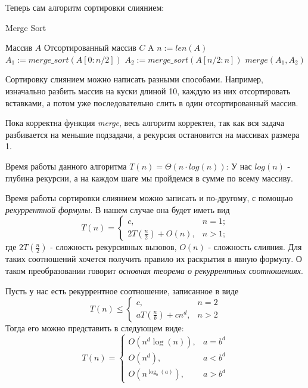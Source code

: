 \documentclass[../main.tex]{subfiles}
\begin{document}
	Теперь сам алгоритм сортировки слиянием:
	\begin{algorithm}[H]
		\caption{Merge Sort}
		\begin{algorithmic}[1]
			\Require Массив $A$
			\Ensure Отсортированный массив $C$
					\State \Return A
				\Else
					\State $n := len(A)$
					\State $A_1 := merge\_sort(A[0: n/2])$
					\State $A_2 := merge\_sort(A[n/2: n])$
					\State \Return $merge(A_1, A_2)$
				\EndIf
		
			\EndFunction
		\end{algorithmic}
	\end{algorithm}
	\begin{remark}
		Сортировку слиянием можно написать разными способами. Например, изначально разбить массив на куски длиной 10, каждую из них отсортировать вставками, а потом уже последовательно слить в один отсортированный массив.
	\end{remark}
	\begin{proof_cor}
		Пока корректна функция \textit{merge}, весь алгоритм корректен, так как вся задача разбивается на меньшие подзадачи, а рекурсия остановится на массивах размера 1.
	\end{proof_cor}
	\begin{time}
		Время работы данного алгоритма $T(n) = \Theta(n\cdot log(n))$: У нас $log(n)$ - глубина рекурсии, а на каждом шаге мы пройдемся в сумме по всему массиву. 
		
	\end{time} 
	
	
	Время работы сортировки слиянием можно записать и по-другому, с помощью \textit{рекуррентной формулы}. В нашем случае она будет иметь вид
	\[
	T(n) = 
	\begin{cases}
		c, & n = 1; \\
		2T(\frac{n}{2}) + O(n), & n > 1;
	\end{cases}
	\]
	где $2T(\frac{n}{2})$ - сложность рекурсивных вызовов, $O(n)$ - сложность слияния. Для таких соотношений хочется получить правило их раскрытия в явную формулу. О таком преобразовании говорит \textit{основная теорема о рекуррентных соотношениях}.
	
	\begin{theorem}
		Пусть у нас есть рекуррентное соотношение, записанное в виде
		\[
		T(n) \leqslant
		\begin{cases}
		c, & n = 2\\
		aT(\frac{n}{b}) + cn^d, & n > 2
		\end{cases}
		\]
		Тогда его можно представить в следующем виде:
		\[
		T(n) = 
		\begin{cases}
		O(n^d \log(n)), & a = b^d \\
		O(n^d), & a < b^d \\
		O(n^{\log_b(a)}), & a > b^d
		\end{cases}
		\]
	\end{theorem}
	
\end{document}

